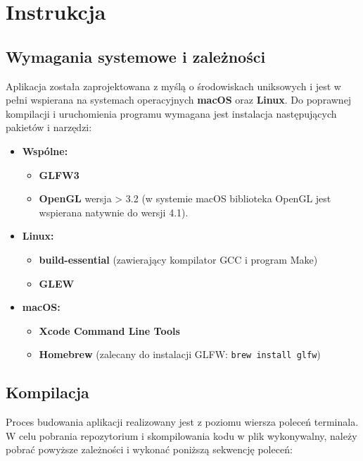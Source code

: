 \documentclass[xodstep]{wnspt}
\begin{document}
\appendix
\chapter{Instrukcja}

    \section{Wymagania systemowe i zależności}
    Aplikacja została zaprojektowana z myślą o środowiskach uniksowych i jest w pełni wspierana na systemach operacyjnych \textbf{macOS} oraz \textbf{Linux}. Do poprawnej kompilacji i uruchomienia programu wymagana jest instalacja następujących pakietów i narzędzi:

        \begin{itemize}
            \item \textbf{Wspólne:}
                \begin{itemize}
                    \item \textbf{GLFW3}
                    \item \textbf{OpenGL} wersja > 3.2 (w systemie macOS biblioteka OpenGL jest wspierana natywnie do wersji 4.1).
                \end{itemize}
            \item \textbf{Linux:}
                \begin{itemize}
                    \item \textbf{build-essential} (zawierający kompilator GCC i program Make)
                    \item \textbf{GLEW}
                \end{itemize}
            \item \textbf{macOS:}
                \begin{itemize}
                    \item \textbf{Xcode Command Line Tools}
                    \item \textbf{Homebrew} (zalecany do instalacji GLFW: \texttt{brew install glfw})
                \end{itemize}
        \end{itemize}

    \section{Kompilacja}
    Proces budowania aplikacji realizowany jest z poziomu wiersza poleceń terminala. W celu pobrania repozytorium i skompilowania kodu w plik wykonywalny, należy pobrać powyższe zależności i wykonać poniższą sekwencję poleceń:
\end{document}
